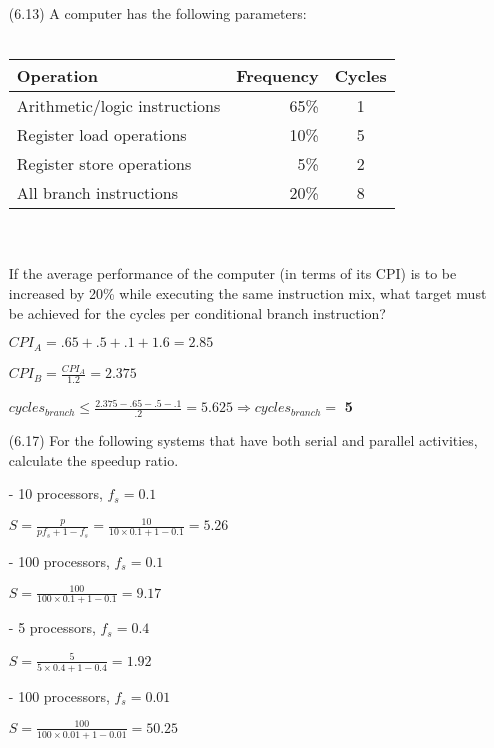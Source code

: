 \documentclass[letterpaper,10pt,titlepage]{article}
\begin{document}
\begin{enumerate}
	\item[(6.13)] A computer has the following parameters:\\
		\\
		\begin{tabular}{ l r c }
			Operation & Frequency & Cycles \\
			\hline
			Arithmetic/logic instructions & 65\% & 1 \\
			     Register load operations & 10\% & 5 \\
			    Register store operations &  5\% & 2 \\
			      All branch instructions & 20\% & 8 \\
		\end{tabular} \\ \\
		If the average performance of the computer (in terms of its CPI) is to be
		increased by 20\% while executing the same instruction mix, what target
		must be achieved for the cycles per conditional branch instruction?
	\item[\textbullet] $CPI_{A} = .65 + .5 + .1 + 1.6 = 2.85$
	\item[\textbullet] $CPI_{B} = \frac{CPI_{A}}{1.2} = 2.375$
	\item[\textbullet] $cycles_{branch} \leq \frac{2.375-.65-.5-.1}{.2} = 5.625
		\Rightarrow cycles_{branch} = $ \textbf{5}

	\item[(6.17)] For the following systems that have both serial and parallel
		activities, calculate the speedup ratio.
	\item[-] 10 processors, $f_{s} = 0.1$
	\item[\textbullet] $S = \frac{p}{pf_{s}+1-f_{s}} = \frac{10}{10\times0.1+1-0.1} =
		5.26$
	\item[-] 100 processors, $f_{s} = 0.1$
	\item[\textbullet] $S = \frac{100}{100\times0.1+1-0.1} = 9.17$
	\item[-] 5 processors, $f_{s} = 0.4$
	\item[\textbullet] $S = \frac{5}{5\times0.4+1-0.4} = 1.92$
	\item[-] 100 processors, $f_{s} = 0.01$
	\item[\textbullet] $S = \frac{100}{100\times0.01+1-0.01} = 50.25$


\end{enumerate}
\end{document}
